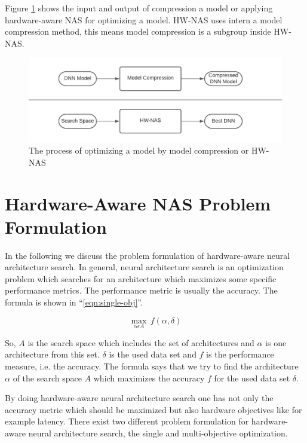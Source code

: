 \documentclass[conference]{IEEEtran}
\begin{document}
Figure \ref{fig:Optimization} \cite{bib1} shows the input and output of compression a model or applying hardware-aware NAS for optimizing a model. HW-NAS uses intern a model compression method, this means model compression is a subgroup inside HW-NAS.

\begin{figure}[htbp]
\centerline{\includegraphics[width=\linewidth]{Optimization.png}}
\caption{The process of optimizing a model by model compression or HW-NAS \cite{bib1}}
\label{fig:Optimization}
\end{figure}

\section{Hardware-Aware NAS Problem Formulation}
\label{section:ProblemFormulation}
In the following we discuss the problem formulation of hardware-aware neural architecture search. In general, neural architecture search is an optimization problem which searches for an architecture which maximizes some specific performance metrics. The performance metric is usually the accuracy. The formula is shown in ``\eqref{eqn:single-obj}''. 
 
\begin{equation}
\label{eqn:single-obj}
\max_{\alpha\epsilon A}\,f(\alpha, \delta)
\end{equation}

So, $A$ is the search space which includes the set of architectures and $\alpha$ is one architecture from this set. $\delta$ is the used data set and $f$ is the performance measure, i.e. the accuracy. The formula says that we try to find the architecture $\alpha$ of the search space $A$ which maximizes the accuracy $f$ for the used data set $\delta$. 
 
By doing hardware-aware neural architecture search one has not only the accuracy metric which should be maximized but also hardware objectives like for example latency. There exist two different problem formulation for hardware-aware neural architecture search, the single and multi-objective optimization.
\end{document}
